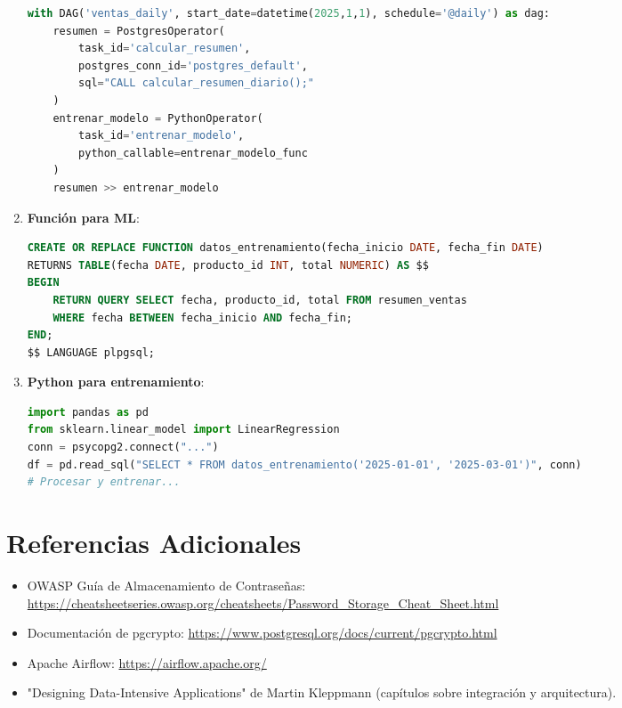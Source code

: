 \documentclass[12pt,a4paper,openany,oneside]{book}
\begin{document}
\begin{enumerate}
\begin{lstlisting}[language=Python]
with DAG('ventas_daily', start_date=datetime(2025,1,1), schedule='@daily') as dag:
    resumen = PostgresOperator(
        task_id='calcular_resumen',
        postgres_conn_id='postgres_default',
        sql="CALL calcular_resumen_diario();"
    )
    entrenar_modelo = PythonOperator(
        task_id='entrenar_modelo',
        python_callable=entrenar_modelo_func
    )
    resumen >> entrenar_modelo
\end{lstlisting}
    \item \textbf{Función para ML}:
\begin{lstlisting}[language=SQL]
CREATE OR REPLACE FUNCTION datos_entrenamiento(fecha_inicio DATE, fecha_fin DATE)
RETURNS TABLE(fecha DATE, producto_id INT, total NUMERIC) AS $$
BEGIN
    RETURN QUERY SELECT fecha, producto_id, total FROM resumen_ventas
    WHERE fecha BETWEEN fecha_inicio AND fecha_fin;
END;
$$ LANGUAGE plpgsql;
\end{lstlisting}
    \item \textbf{Python para entrenamiento}:
\begin{lstlisting}[language=Python]
import pandas as pd
from sklearn.linear_model import LinearRegression
conn = psycopg2.connect("...")
df = pd.read_sql("SELECT * FROM datos_entrenamiento('2025-01-01', '2025-03-01')", conn)
# Procesar y entrenar...
\end{lstlisting}
\end{enumerate}

\chapter*{Referencias Adicionales}
\begin{itemize}
    \item OWASP Guía de Almacenamiento de Contraseñas: \url{https://cheatsheetseries.owasp.org/cheatsheets/Password_Storage_Cheat_Sheet.html}
    \item Documentación de pgcrypto: \url{https://www.postgresql.org/docs/current/pgcrypto.html}
    \item Apache Airflow: \url{https://airflow.apache.org/}
    \item "Designing Data-Intensive Applications" de Martin Kleppmann (capítulos sobre integración y arquitectura).
\end{itemize}
\end{document}
